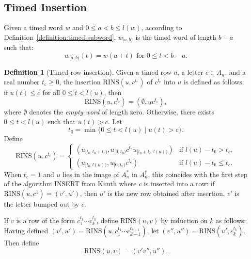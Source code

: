 \documentclass[10pt]{amsproc}
\theoremstyle{definition}
\newtheorem{definition}[theorem]{Definition}
\theoremstyle{remark}
\newcommand{\rowins}{\mathrm{RINS}}
\begin{document}
\subsection{Timed Insertion}
\label{sec:timed-insertion}
Given a timed word $w$ and $0\leq a < b \leq l(w)$, according to Definition~\ref{definition:timed-subword}, $w_{[a, b)}$ is the timed word of length $b-a$ such that:
\begin{displaymath}
  w_{[a, b)}(t) = w(a+ t) \text{ for } 0\leq t<b-a.
\end{displaymath}
\begin{definition}[Timed row insertion]
  \label{definition:timed-row-insertion}
  Given a timed row $u$, a letter $c\in A_n$, and a real number $t_c\geq 0$, the insertion $\rowins(u, c^{t_c})$ of $c^{t_c}$ into $u$ is defined as follows:
  if $u(t)\leq c$ for all $0\leq t < l(u)$, then
  \begin{displaymath}
    \rowins(u, c^{t_c}) = (\emptyset, uc^{t_c}),
  \end{displaymath}
  where $\emptyset$ denotes the \emph{empty word} of length zero.
  Otherwise, there exists $0\leq t < l(u)$ such that $u(t)>c$.
  Let
  \begin{displaymath}
    t_0 = \min\{0\leq t< l(u) \mid u(t)> c\}.
  \end{displaymath}
  Define
  \begin{displaymath}
    \rowins(u, c^{t_c}) =
    \begin{cases}
      (u_{[t_0, t_0+t_c)}, u_{[0, t_0)}c^{t_c} u_{[t_0+t_c, l(u))}) & \text{if } l(u) - t_0 > t_c,\\
      (u_{[t_0, l(u))}, u_{[0, t_0)} c^{t_c}) & \text{if } l(u) - t_0 \leq t_c.
    \end{cases}
  \end{displaymath}
  When $t_c=1$ and $u$ lies in the image of $A_n^*$ in $A_n^\dagger$, this coincides with the first step of the algorithm INSERT from Knuth \cite{knuth} where $c$ is inserted into a row:
  if $\rowins(u,c^1)=(v',u')$, then $u'$ is the new row obtained after insertion, $v'$ is the letter bumped out by $c$.

  If $v$ is a row of the form $c_1^{t_1}\dotsb c_k^{t_k}$, define $\rowins(u,v)$ by induction on $k$ as follows:
  Having defined $(v',u')=\rowins(u,c_1^{t_1}\dotsb c_{k-1}^{t_{k-1}})$, let $(v'', u'')=\rowins(u',c_k^{t_k})$.
  Then define
  \begin{displaymath}
    \rowins(u,v) = (v'v'', u'').
  \end{displaymath}
\end{definition}
\end{document}
